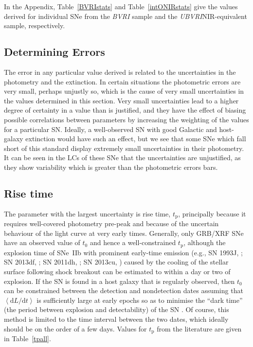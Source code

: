 \documentclass[a4paper,fleqn,usenatbib]{mnras}
\begin{document}
In the Appendix, Table~\ref{BVRIstats} and Table~\ref{intONIRstats} give the values derived for individual SNe from the \textit{BVRI} sample and the \textit{UBVRI}NIR-equivalent sample, respectively.

\subsection{Determining Errors}
The error in any particular value derived is related to the uncertainties in the photometry and the extinction. In certain situations the photometric errors are very small, perhaps unjustly so, which is the cause of very small uncertainties in the values determined in this section. Very small uncertainties lead to a higher degree of certainty in a value than is justified, and they have the effect of biasing possible correlations between parameters by increasing the weighting of the values for a particular SN. Ideally, a well-observed SN with good Galactic and host-galaxy extinction would have such an effect, but we see that some SNe which fall short of this standard display extremely small uncertainties in their photometry. It can be seen in the LCs of these SNe that the uncertainties are unjustified, as they show variability which is greater than the photometric errors bars. 
\subsection{Rise time} 
The parameter with the largest uncertainty is rise time, $t_{\mathrm{p}}$, principally because it requires well-covered photometry pre-peak and because of the uncertain behaviour of the light curve at very early times. Generally, only GRB/XRF SNe have an observed value of $t_0$ and hence a well-constrained $t_{\mathrm{p}}$, although the explosion time of SNe~IIb with prominent early-time emission (e.g., SN 1993J, \citealt{Matheson2000}; SN 2013df, \citealt{Vandyk2014}; SN 2011dh, \citealt{Arcavi2011}; SN 2013cu, \citealt{Galyam2014}) caused by the cooling of the stellar surface following shock breakout \citep{Woosley1994} can be estimated to within a day or two of explosion. If the SN is found in a host galaxy that is regularly observed, then $t_0$ can be constrained between the detection and nondetection dates assuming that $\left\langle \mathrm{d}L/\mathrm{d}t\right\rangle$ is sufficiently large at early epochs so as to minimise the ``dark time'' (the period between explosion and detectability) of the SN \citep[e.g., PTF10vgv;][]{Corsi2012}. Of course, this method is limited to the time interval between the two dates, which ideally should be on the order of a few days. Values for $t_{\mathrm{p}}$ from the literature are given in Table~\ref{tpall}.
\end{document}

